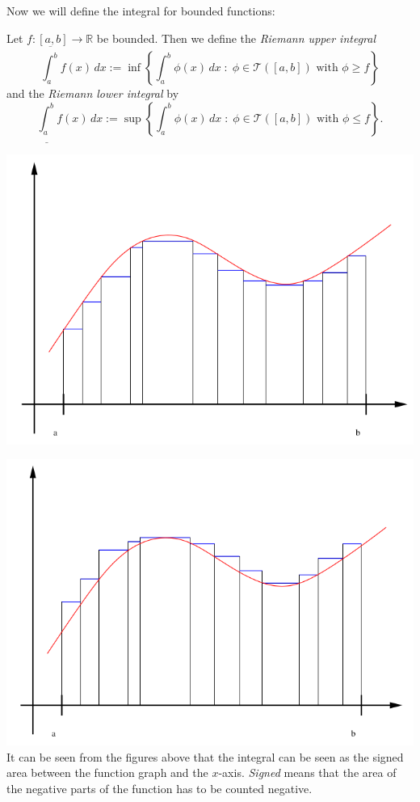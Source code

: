 

Now we will define the integral for bounded functions:

\begin{Definition}{}
Let $f:[a,b]\to\mathbb{R}$ be bounded. Then we define the \emph{Riemann upper integral}
\[\overline{\int_a^b}f(x)\, dx:=\inf\left\{\int_a^b\phi(x)\, dx\;:\;\phi\in\mathcal{T}([a,b])\text{ with }\phi\geq f\right\}\]
and the \emph{Riemann lower integral} by
\[\underline{\int_a^b}f(x)\, dx:=\sup\left\{\int_a^b\phi(x)\, dx\;:\;\phi\in\mathcal{T}([a,b])\text{ with }\phi\leq f\right\}.\]
\end{Definition}

\includegraphics{./lower.png}

\includegraphics{./upper.png}
% 
It can be seen from the figures above that the integral can be seen as the signed area between the function graph and the $x$-axis. 
\emph{Signed} means that the area of the negative parts of the function has to be counted negative.


